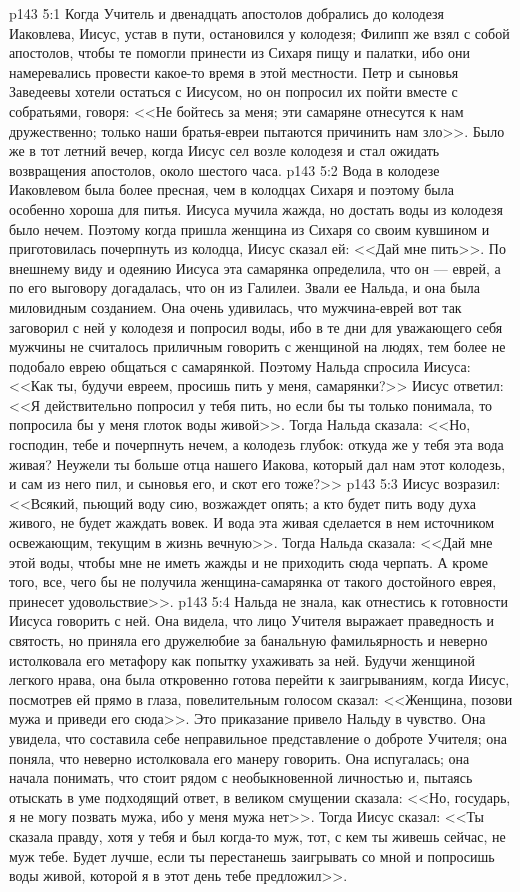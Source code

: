 \vs p143 5:1 Когда Учитель и двенадцать апостолов добрались до колодезя Иаковлева, Иисус, устав в пути, остановился у колодезя; Филипп же взял с собой апостолов, чтобы те помогли принести из Сихаря пищу и палатки, ибо они намеревались провести какое\hyp{}то время в этой местности. Петр и сыновья Заведеевы хотели остаться с Иисусом, но он попросил их пойти вместе с собратьями, говоря: <<Не бойтесь за меня; эти самаряне отнесутся к нам дружественно; только наши братья\hyp{}евреи пытаются причинить нам зло>>. Было же в тот летний вечер, когда Иисус сел возле колодезя и стал ожидать возвращения апостолов, около шестого часа.
\vs p143 5:2 Вода в колодезе Иаковлевом была более пресная, чем в колодцах Сихаря и поэтому была особенно хороша для питья. Иисуса мучила жажда, но достать воды из колодезя было нечем. Поэтому когда пришла женщина из Сихаря со своим кувшином и приготовилась почерпнуть из колодца, Иисус сказал ей: <<Дай мне пить>>. По внешнему виду и одеянию Иисуса эта самарянка определила, что он --- еврей, а по его выговору догадалась, что он из Галилеи. Звали ее Нальда, и она была миловидным созданием. Она очень удивилась, что мужчина\hyp{}еврей вот так заговорил с ней у колодезя и попросил воды, ибо в те дни для уважающего себя мужчины не считалось приличным говорить с женщиной на людях, тем более не подобало еврею общаться с самарянкой. Поэтому Нальда спросила Иисуса: <<Как ты, будучи евреем, просишь пить у меня, самарянки?>> Иисус ответил: <<Я действительно попросил у тебя пить, но если бы ты только понимала, то попросила бы у меня глоток воды живой>>. Тогда Нальда сказала: <<Но, господин, тебе и почерпнуть нечем, а колодезь глубок: откуда же у тебя эта вода живая? Неужели ты больше отца нашего Иакова, который дал нам этот колодезь, и сам из него пил, и сыновья его, и скот его тоже?>>
\vs p143 5:3 Иисус возразил: <<Всякий, пьющий воду сию, возжаждет опять; а кто будет пить воду духа живого, не будет жаждать вовек. И вода эта живая сделается в нем источником освежающим, текущим в жизнь вечную>>. Тогда Нальда сказала: <<Дай мне этой воды, чтобы мне не иметь жажды и не приходить сюда черпать. А кроме того, все, чего бы не получила женщина\hyp{}самарянка от такого достойного еврея, принесет удовольствие>>.
\vs p143 5:4 Нальда не знала, как отнестись к готовности Иисуса говорить с ней. Она видела, что лицо Учителя выражает праведность и святость, но приняла его дружелюбие за банальную фамильярность и неверно истолковала его метафору как попытку ухаживать за ней. Будучи женщиной легкого нрава, она была откровенно готова перейти к заигрываниям, когда Иисус, посмотрев ей прямо в глаза, повелительным голосом сказал: <<Женщина, позови мужа и приведи его сюда>>. Это приказание привело Нальду в чувство. Она увидела, что составила себе неправильное представление о доброте Учителя; она поняла, что неверно истолковала его манеру говорить. Она испугалась; она начала понимать, что стоит рядом с необыкновенной личностью и, пытаясь отыскать в уме подходящий ответ, в великом смущении сказала: <<Но, государь, я не могу позвать мужа, ибо у меня мужа нет>>. Тогда Иисус сказал: <<Ты сказала правду, хотя у тебя и был когда\hyp{}то муж, тот, с кем ты живешь сейчас, не муж тебе. Будет лучше, если ты перестанешь заигрывать со мной и попросишь воды живой, которой я в этот день тебе предложил>>.
